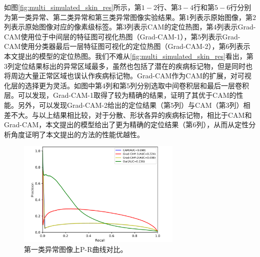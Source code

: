 如图\ref{fig:multi_simulated_skin_res}所示，第$1-2$行、第$3-4$行和第$5-6$行分别为第一类异常、第二类异常和第三类异常图像实验结果。第$1$列表示原始图像，第$2$列表示原始图像对应的像素级标签。第$3$列表示CAM的定位热图，第$4$列表示Grad-CAM使用位于中间层的特征图可视化热图（Grad-CAM-1），第$5$列表示Grad-CAM使用分类器最后一层特征图可视化的定位热图（Grad-CAM-2），第$6$列表示本文提出的模型的定位热图。我们不难从\ref{fig:multi_simulated_skin_res}看出，第$3$列定位结果标出的异常区域最多，虽然也包括了潜在的疾病标记物，但是同时也将周边大量正常区域也误认作疾病标记物。Grad-CAM作为CAM的扩展，对可视化层的选择更为灵活。如图中第$4$列和第$5$列分别选取中间卷积层和最后一层卷积层。可以发现，Grad-CAM-1取得了较为精确的结果，证明了其优于CAM的性能。另外，可以发现Grad-CAM-2给出的定位结果（第$5$列）与CAM（第$3$列）相差不大。与以上结果相比较，对于分散、形状各异的疾病标记物，相比于CAM和Grad-CAM，本文提出的模型给出了更为精确的定位结果（第$6$列），从而从定性分析角度证明了本文提出的方法的性能优越性。
\begin{figure}[H]
	\centering
	\includegraphics[width=0.7\textwidth]{figure/pr_curve_multi_skin/IMAGE_NET_pr_curve.png}
	\caption[第一类异常图像上P-R曲线对比]{第一类异常图像上P-R曲线对比。} 
	\label{fig:multi_simulate_pr_curve_image_net}
\end{figure}
